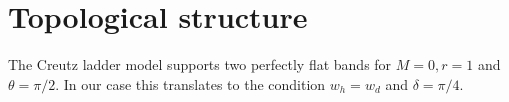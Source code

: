 \section{Topological structure}
The Creutz ladder model supports two perfectly flat bands for $M=0, r=1$ and $\theta=\pi/2$.
In our case this translates to the condition $w_h=w_d$ and $\delta=\pi/4$.








